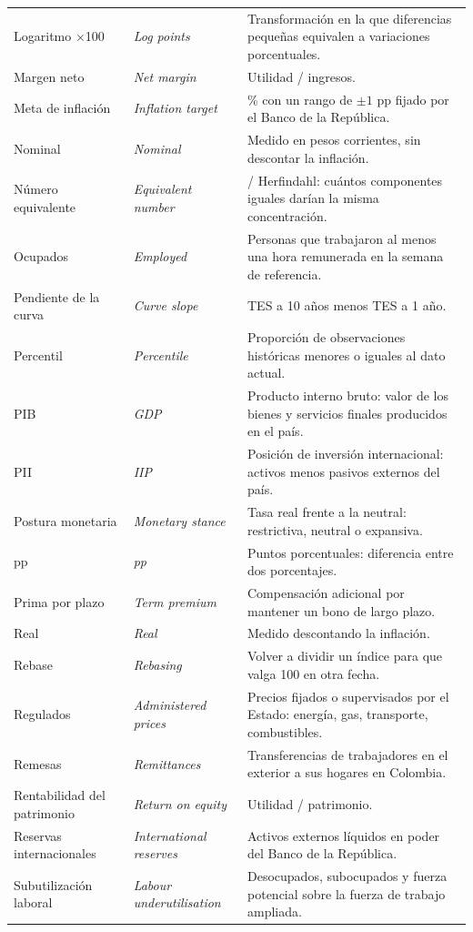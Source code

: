 \begin{longtable}{>{\raggedright\arraybackslash}p{3.2cm}>{\raggedright\arraybackslash\itshape}p{3.2cm}>{\raggedright\arraybackslash}p{8.2cm}}
Logaritmo $\times$100 & Log points & Transformación en la que diferencias pequeñas equivalen a variaciones porcentuales.\\
Margen neto & Net margin & Utilidad / ingresos.\\
Meta de inflación & Inflation target & 3\% con un rango de $\pm1$ pp fijado por el Banco de la República.\\
Nominal & Nominal & Medido en pesos corrientes, sin descontar la inflación.\\
Número equivalente & Equivalent number & 1 / Herfindahl: cuántos componentes iguales darían la misma concentración.\\
Ocupados & Employed & Personas que trabajaron al menos una hora remunerada en la semana de referencia.\\
Pendiente de la curva & Curve slope & TES a 10 años menos TES a 1 año.\\
Percentil & Percentile & Proporción de observaciones históricas menores o iguales al dato actual.\\
PIB & GDP & Producto interno bruto: valor de los bienes y servicios finales producidos en el país.\\
PII & IIP & Posición de inversión internacional: activos menos pasivos externos del país.\\
Postura monetaria & Monetary stance & Tasa real frente a la neutral: restrictiva, neutral o expansiva.\\
pp & pp & Puntos porcentuales: diferencia entre dos porcentajes.\\
Prima por plazo & Term premium & Compensación adicional por mantener un bono de largo plazo.\\
Real & Real & Medido descontando la inflación.\\
Rebase & Rebasing & Volver a dividir un índice para que valga 100 en otra fecha.\\
Regulados & Administered prices & Precios fijados o supervisados por el Estado: energía, gas, transporte, combustibles.\\
Remesas & Remittances & Transferencias de trabajadores en el exterior a sus hogares en Colombia.\\
Rentabilidad del patrimonio & Return on equity & Utilidad / patrimonio.\\
Reservas internacionales & International reserves & Activos externos líquidos en poder del Banco de la República.\\
Subutilización laboral & Labour underutilisation & Desocupados, subocupados y fuerza potencial sobre la fuerza de trabajo ampliada.\\

\end{longtable}
